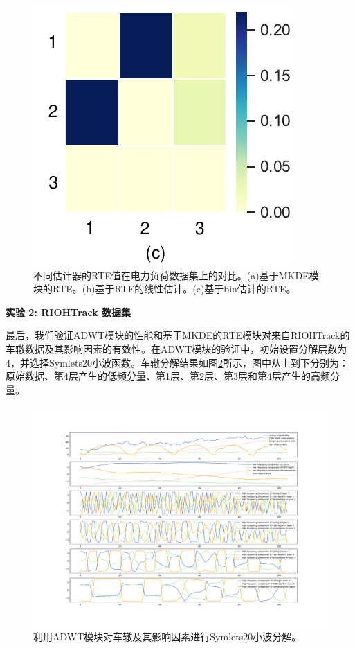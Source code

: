 \begin{figure}[!ht]
\begin{center}
\includegraphics[scale=0.5]{./ch3/fig3_14.pdf}
\caption{不同估计器的RTE值在电力负荷数据集上的对比。(a)基于MKDE模块的RTE。(b)基于RTE的线性估计。(c)基于bin估计的RTE。} \label{Figure9}
\end{center}
\end{figure}

\textbf{实验 2: RIOHTrack 数据集}

最后，我们验证ADWT模块的性能和基于MKDE的RTE模块对来自RIOHTrack的车辙数据及其影响因素的有效性。在ADWT模块的验证中，初始设置分解层数为4，并选择Symlets20小波函数。车辙分解结果如图\ref{Figure10}所示，图中从上到下分别为：原始数据、第4层产生的低频分量、第1层、第2层、第3层和第4层产生的高频分量。

\begin{figure}[!ht]
\begin{center}
\includegraphics[scale=0.26]{./ch3/fig3_15.pdf}
\caption{利用ADWT模块对车辙及其影响因素进行Symlets20小波分解。} \label{Figure10}
\end{center}
\end{figure}

